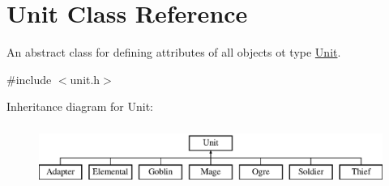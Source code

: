 \hypertarget{class_unit}{\section{\-Unit \-Class \-Reference}
\label{class_unit}
}


\-An abstract class for defining attributes of all objects ot type \hyperlink{class_unit}{\-Unit}.  




{\ttfamily \#include $<$unit.\-h$>$}

\-Inheritance diagram for \-Unit\-:\begin{figure}[H]
\begin{center}
\leavevmode
\includegraphics[height=2.000000cm]{class_unit}
\end{center}
\end{figure}
